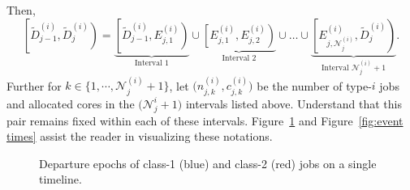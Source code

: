 \documentclass[11pt]{article}
\theoremstyle{remark}
\theoremstyle{definition}
\numberwithin{equation}{section}
\begin{document}
Then,
\[
\left[\widetilde{D}^{(i)}_{j-1},\widetilde{D}^{(i)}_{j}\right)= \underbrace{\left[\widetilde{D}^{(i)}_{j-1}, E^{(i)}_{j,1}\right)}_{\text{Interval 1}} \cup \underbrace{\left[E^{(i)}_{j,1}, E^{(i)}_{j,2}\right)}_{\text{Interval 2}} \cup  \ldots \cup \underbrace{\left[E^{(i)}_{j,\mathscr N^{(i)}_{j}}, \widetilde{D}^{(i)}_{j}\right)}_{\text{Interval } \mathscr N^{(i)}_j+1}.
\]
Further for $k \in \big\{1, \cdots, \mathscr{N}^{(i)}_j+1\big\}$, let $\Big(n^{(i)}_{j,k}, c^{(i)}_{j,k}\Big)$ be the number of type-$i$ jobs and allocated cores in the $\big(\mathscr N^{i}_j+1\big)$ intervals listed above.
Understand that this pair remains fixed within each of these intervals.
Figure~\ref{fig:departure times} and Figure~\ref{fig:event times} assist the reader in visualizing these notations.

\begin{figure}[htbp]
    \centering
    \caption{Departure epochs of class-1 (blue) and class-2 (red) jobs on a single timeline.}
    \label{fig:departure times}
\end{figure}
\end{document}

